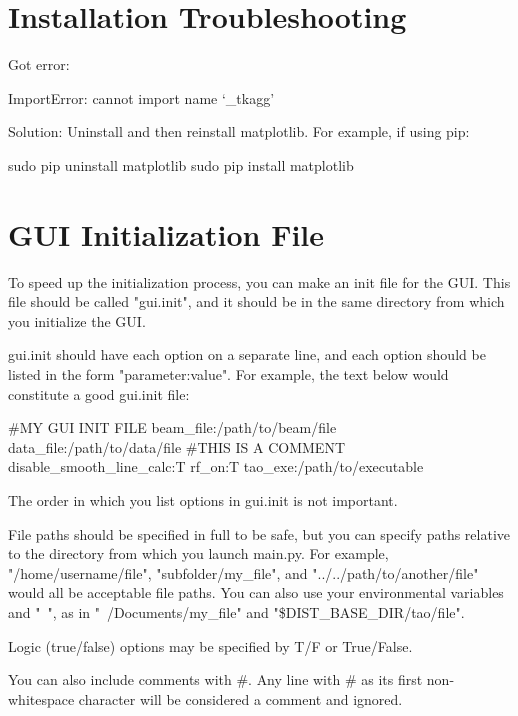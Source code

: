 \section{Installation Troubleshooting}
\label{s:gui.trouble}

Got error:
\begin{example}
  ImportError: cannot import name ‘_tkagg'
\end{example}

Solution: Uninstall and then reinstall matplotlib. For example, if using pip:
\begin{example}
  sudo pip uninstall matplotlib
  sudo pip install matplotlib
\end{example}

\section{GUI Initialization File}
\label{s:gui.init.file}

To speed up the initialization process, you can make an init file for the GUI.  This file should be called "gui.init", and it should be in the same directory from which you initialize the GUI.

gui.init should have each option on a separate line, and each option should be listed in the form "parameter:value".  For example, the text below would constitute a good gui.init file:

\begin{example}
  #MY GUI INIT FILE
  beam_file:/path/to/beam/file
  data_file:/path/to/data/file
  #THIS IS A COMMENT
  disable_smooth_line_calc:T
  rf_on:T
  tao_exe:/path/to/executable
\end{example}

The order in which you list options in gui.init is not important.

File paths should be specified in full to be safe, but you can specify paths relative to the directory from which you launch main.py.  For example, "/home/username/file", "subfolder/my_file", and "../../path/to/another/file" would all be acceptable file paths.  You can also use your environmental variables and "~", as in "~/Documents/my_file" and "\$DIST_BASE_DIR/tao/file".

Logic (true/false) options may be specified by T/F or True/False.

You can also include comments with \#.  Any line with \# as its first non-whitespace character will be considered a comment and ignored.

